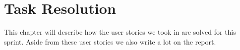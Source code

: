 \chapter{Task Resolution}
This chapter will describe how the user stories we took in  are solved for this sprint.
Aside from these user stories we also write a lot on the report.



